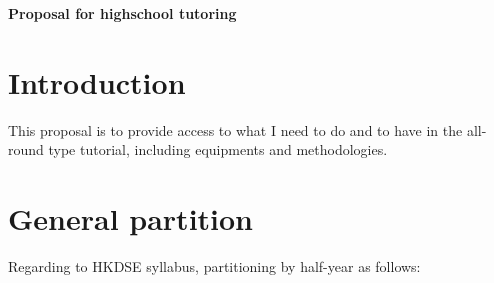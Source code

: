 \documentclass{article}
\begin{document}
    \begin{center}
        \textbf{Proposal for highschool tutoring}
    \end{center}

    \section*{Introduction}

    This proposal is to provide access to what I need to do and to have in the all-round type tutorial, including equipments and methodologies.

    \section*{General partition}

    Regarding to HKDSE syllabus, partitioning by half-year as follows:
\end{document}
